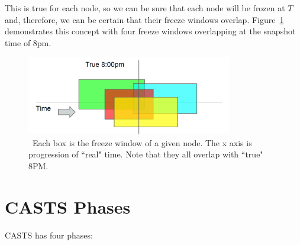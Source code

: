 This is true for each node, so we can be sure that each node will be
frozen at $T$ and, therefore, we can be certain that their freeze
windows overlap. Figure~\ref{fig:overlapping-windows} demonstrates
this concept with four freeze windows overlapping at the snapshot time
of 8pm.

\begin{figure}[!htbp]
  \centering
  \caption{~Each box is the freeze window of a given node. The x axis is progression of ``real" time. Note that they all overlap with ``true" 8PM.}
  \label{fig:overlapping-windows}
  \includegraphics[width=0.8\textwidth]{overlapping-windows.png}
\end{figure}


\section{CASTS Phases}
CASTS has four phases:

